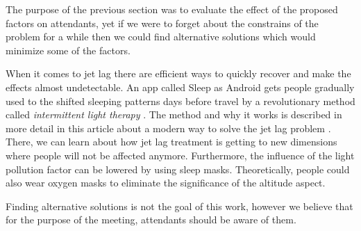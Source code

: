 The purpose of the previous section was to evaluate the effect of the proposed factors on attendants, yet if we were to forget about the constrains of the problem for a while then we could find alternative solutions which would  minimize some of the factors. 

When it comes to jet lag there are efficient ways to quickly recover and make the effects almost undetectable. An app called Sleep as Android gets people gradually used to the shifted sleeping patterns days before travel by a revolutionary method called \emph{intermittent light therapy} \cite{JiriRichter2016}. The method and why it works is described in more detail in this article about a modern way to solve the jet lag problem \cite{TracieWhite2016}. There, we can learn about how jet lag treatment is getting to new dimensions where people will not be affected anymore. Furthermore, the influence of the light pollution factor can be lowered by using sleep masks. Theoretically, people could also wear oxygen masks to eliminate the significance of the altitude aspect.

Finding alternative solutions is not the goal of this work, however we believe that for the purpose of the meeting, attendants should be aware of them.